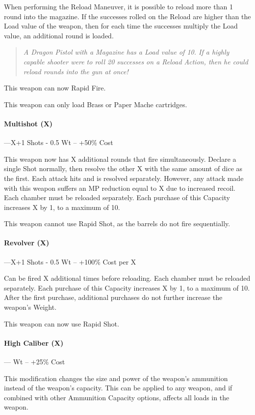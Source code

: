 \documentclass[oneside,11pt,english]{book}
\begin{document}
When performing the Reload Maneuver, it is possible to reload more than 1 round
into the magazine. If the successes rolled on the Reload are higher than the
Load value of the weapon, then for each time the successes multiply the Load
value, an additional round is loaded. 
\begin{quote}
  \emph{A Dragon Pistol with a Magazine has a Load value of 10. If a highly capable shooter were to roll 20 successes on a Reload Action, then he could reload rounds into the gun at once!}
\end{quote}

This weapon can now Rapid Fire.

This weapon can only load Brass or Paper Mache cartridges.

\paragraph{Multishot (X)}---\quad X+1 Shots - 0.5 Wt -- +50\% Cost

This weapon now has X additional rounds that fire simultaneously. Declare a single Shot normally, then resolve the other X with the same amount of dice as the first.
Each attack hits and is resolved separately. However, any attack made with this weapon suffers an MP reduction equal to X due to increased recoil. Each chamber must be reloaded separately. Each purchase of this Capacity increases X by 1, to a maximum of 10.

This weapon cannot use Rapid Shot, as the barrels do not fire sequentially.

\paragraph{Revolver (X)}---\quad X+1 Shots - 0.5 Wt -- +100\% Cost per X

Can be fired X additional times before reloading. Each chamber must be reloaded separately. Each purchase of this Capacity increases X by 1, to a maximum of 10. 
After the first purchase, additional purchases do not further increase the weapon’s Weight. 

This weapon can now use Rapid Shot. 

\paragraph{High Caliber (X)}--- Wt -- +25\% Cost

This modification changes the size and power of the weapon’s ammunition instead of the weapon’s capacity. This can be applied to any weapon, and if combined with other Ammunition Capacity options, affects all loads in the weapon.
\end{document}
